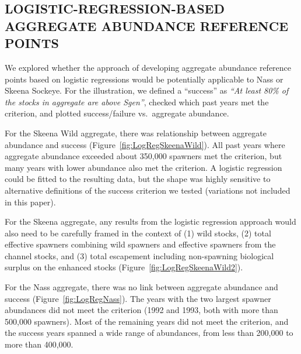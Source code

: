 \documentclass[french,11pt]{book}
\begin{document}
\subsection{LOGISTIC-REGRESSION-BASED AGGREGATE ABUNDANCE REFERENCE POINTS}\label{LogRegResults}

We explored whether the approach of developing aggregate abundance reference points based on logistic regressions would be potentially applicable to Nass or Skeena Sockeye. For the illustration, we defined a ``success'' as \emph{``At least 80\% of the stocks in aggregate are above Sgen''}, checked which past years met the criterion, and plotted success/failure vs.~aggregate abundance.

For the Skeena Wild aggregate, there was relationship between aggregate abundance and success (Figure~\ref{fig:LogRegSkeenaWild}). All past years where aggregate abundance exceeded about 350,000 spawners met the criterion, but many years with lower abundance also met the criterion. A logistic regression could be fitted to the resulting data, but the shape was highly sensitive to alternative definitions of the success criterion we tested (variations not included in this paper).

For the Skeena aggregate, any results from the logistic regression approach would also need to be carefully framed in the context of (1) wild stocks, (2) total effective spawners combining wild spawners and effective spawners from the channel stocks, and (3) total escapement including non-spawning biological surplus on the enhanced stocks (Figure~\ref{fig:LogRegSkeenaWild2}).

For the Nass aggregate, there was no link between aggregate abundance and success (Figure~\ref{fig:LogRegNass}). The years with the two largest spawner abundances did not meet the criterion (1992 and 1993, both with more than 500,000 spawners). Most of the remaining years did not meet the criterion, and the success years spanned a wide range of abundances, from less than 200,000 to more than 400,000.

\clearpage
\end{document}
